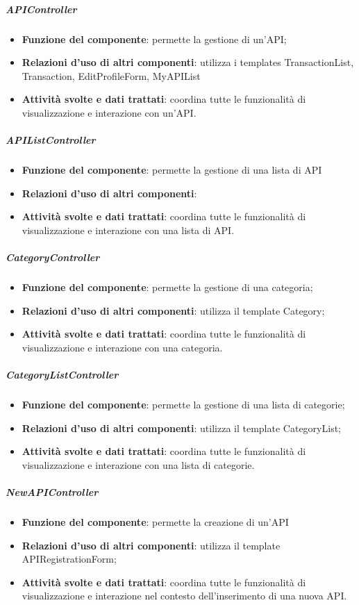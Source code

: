 \subparagraph{APIController}
\begin{itemize}
	\item \textbf{Funzione del componente}: permette la gestione di un'API;
	\item \textbf{Relazioni d’uso di altri componenti}: utilizza i templates TransactionList, Transaction, EditProfileForm, MyAPIList
	\item \textbf{Attività svolte e dati trattati}: coordina tutte le funzionalità di visualizzazione e interazione con un'API.
\end{itemize}

\subparagraph{APIListController}
\begin{itemize}
	\item \textbf{Funzione del componente}: permette la gestione di una lista di API
	\item \textbf{Relazioni d’uso di altri componenti}: 
	\item \textbf{Attività svolte e dati trattati}: coordina tutte le funzionalità di visualizzazione e interazione con una lista di API.
\end{itemize}

\subparagraph{CategoryController}
\begin{itemize}
	\item \textbf{Funzione del componente}: permette la gestione di una categoria;
	\item \textbf{Relazioni d’uso di altri componenti}: utilizza il template Category;
	\item \textbf{Attività svolte e dati trattati}: coordina tutte le funzionalità di visualizzazione e interazione con una categoria.
\end{itemize}

\subparagraph{CategoryListController}
\begin{itemize}
	\item \textbf{Funzione del componente}: permette la gestione di una lista di categorie;
	\item \textbf{Relazioni d’uso di altri componenti}: utilizza il template CategoryList;
	\item \textbf{Attività svolte e dati trattati}: coordina tutte le funzionalità di visualizzazione e interazione con una lista di categorie.
\end{itemize}

\subparagraph{NewAPIController}
\begin{itemize}
	\item \textbf{Funzione del componente}: permette la creazione di un'API	
	\item \textbf{Relazioni d’uso di altri componenti}: utilizza il template APIRegistrationForm;
	\item \textbf{Attività svolte e dati trattati}: coordina tutte le funzionalità di visualizzazione e interazione nel contesto dell'inserimento di una nuova API.
\end{itemize}

